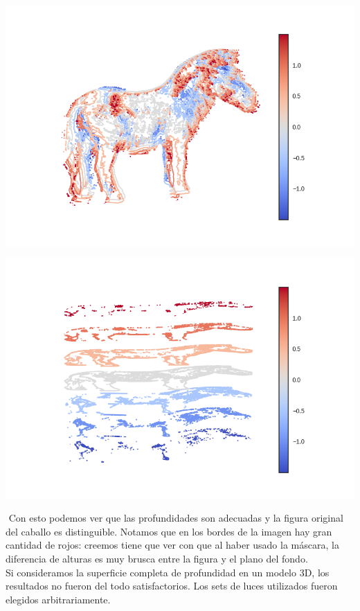 {\centering
    \includegraphics[width=0.80\linewidth]{informe/imagenes/supnivel/supNivelCaballoLucesPropias578N1.png}
}

{\centering
    \includegraphics[width=0.80\linewidth]{informe/imagenes/supnivel/supNivelCaballoLucesPropias578N3.png}
}

$ $\newline
Con esto podemos ver que las profundidades son adecuadas y la figura original del caballo es distinguible. Notamos que en los bordes de la imagen hay gran cantidad de rojos: creemos tiene que ver con que al haber usado la máscara, la diferencia de alturas es muy brusca entre la figura y el plano del fondo.  \\

Si consideramos la superficie completa de profundidad en un modelo 3D, los resultados no fueron del todo satisfactorios. Los sets de luces utilizados fueron elegidos arbitrariamente. \\


